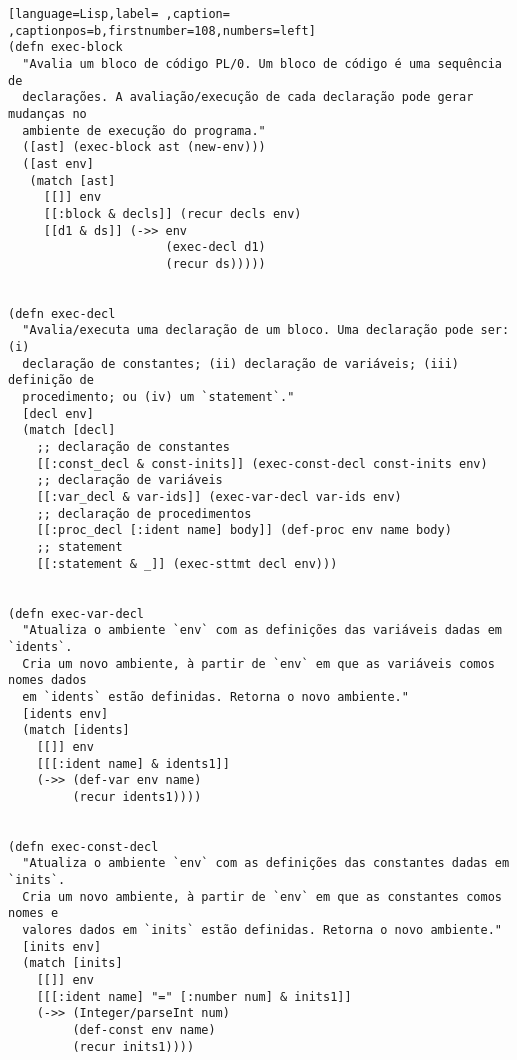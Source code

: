 \documentclass{scrartcl}
\begin{document}
\begin{lstlisting}[language=Lisp,label= ,caption= ,captionpos=b,firstnumber=108,numbers=left]
(defn exec-block
  "Avalia um bloco de código PL/0. Um bloco de código é uma sequência de
  declarações. A avaliação/execução de cada declaração pode gerar mudanças no
  ambiente de execução do programa."
  ([ast] (exec-block ast (new-env)))
  ([ast env]
   (match [ast]
     [[]] env
     [[:block & decls]] (recur decls env)
     [[d1 & ds]] (->> env
                      (exec-decl d1)
                      (recur ds)))))


(defn exec-decl
  "Avalia/executa uma declaração de um bloco. Uma declaração pode ser: (i)
  declaração de constantes; (ii) declaração de variáveis; (iii) definição de
  procedimento; ou (iv) um `statement`."
  [decl env]
  (match [decl]
    ;; declaração de constantes
    [[:const_decl & const-inits]] (exec-const-decl const-inits env)
    ;; declaração de variáveis
    [[:var_decl & var-ids]] (exec-var-decl var-ids env)
    ;; declaração de procedimentos
    [[:proc_decl [:ident name] body]] (def-proc env name body)
    ;; statement
    [[:statement & _]] (exec-sttmt decl env)))


(defn exec-var-decl
  "Atualiza o ambiente `env` com as definições das variáveis dadas em `idents`.
  Cria um novo ambiente, à partir de `env` em que as variáveis comos nomes dados
  em `idents` estão definidas. Retorna o novo ambiente."
  [idents env]
  (match [idents]
    [[]] env
    [[[:ident name] & idents1]]
    (->> (def-var env name)
         (recur idents1))))


(defn exec-const-decl
  "Atualiza o ambiente `env` com as definições das constantes dadas em `inits`.
  Cria um novo ambiente, à partir de `env` em que as constantes comos nomes e
  valores dados em `inits` estão definidas. Retorna o novo ambiente."
  [inits env]
  (match [inits]
    [[]] env
    [[[:ident name] "=" [:number num] & inits1]]
    (->> (Integer/parseInt num)
         (def-const env name)
         (recur inits1))))
\end{lstlisting}
\end{document}
